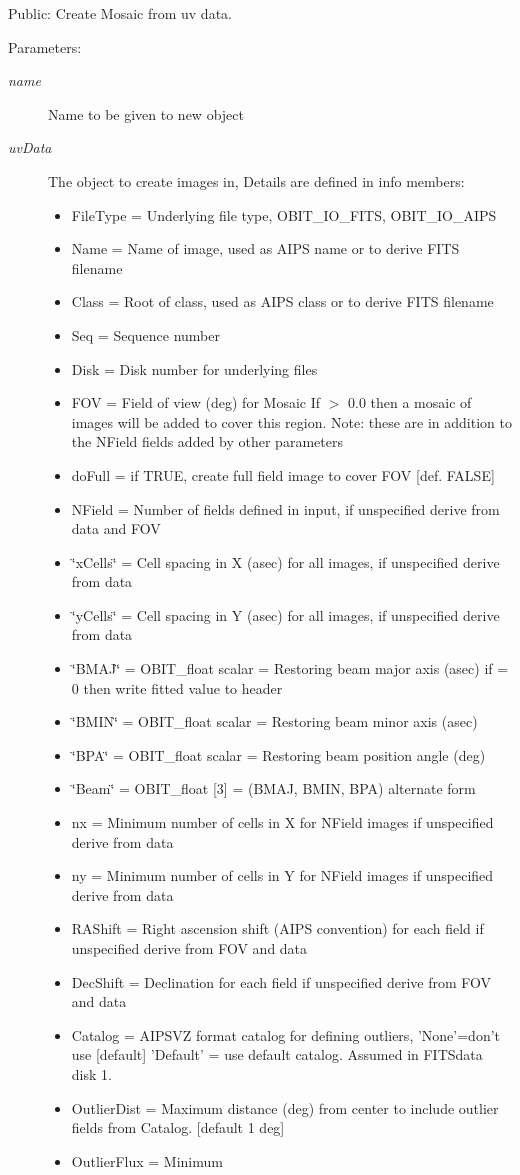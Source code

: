 Public: Create Mosaic from uv data. 

\begin{Desc}
\item[Parameters:]
\begin{description}
\item[{\em name}]Name to be given to new object \item[{\em uv\-Data}]The object to create images in, Details are defined in info members: \begin{itemize}
\item File\-Type = Underlying file type, OBIT\_\-IO\_\-FITS, OBIT\_\-IO\_\-AIPS \item Name = Name of image, used as AIPS name or to derive FITS filename \item Class = Root of class, used as AIPS class or to derive FITS filename \item Seq = Sequence number \item Disk = Disk number for underlying files \item FOV = Field of view (deg) for Mosaic If $>$ 0.0 then a mosaic of images will be added to cover this region. Note: these are in addition to the NField fields added by other parameters \item do\-Full = if TRUE, create full field image to cover FOV [def. FALSE] \item NField = Number of fields defined in input, if unspecified derive from data and FOV \item \char`\"{}x\-Cells\char`\"{} = Cell spacing in X (asec) for all images, if unspecified derive from data \item \char`\"{}y\-Cells\char`\"{} = Cell spacing in Y (asec) for all images, if unspecified derive from data \item \char`\"{}BMAJ\char`\"{} = OBIT\_\-float scalar = Restoring beam major axis (asec) if = 0 then write fitted value to header \item \char`\"{}BMIN\char`\"{} = OBIT\_\-float scalar = Restoring beam minor axis (asec) \item \char`\"{}BPA\char`\"{} = OBIT\_\-float scalar = Restoring beam position angle (deg) \item \char`\"{}Beam\char`\"{} = OBIT\_\-float [3] = (BMAJ, BMIN, BPA) alternate form \item nx = Minimum number of cells in X for NField images if unspecified derive from data \item ny = Minimum number of cells in Y for NField images if unspecified derive from data \item RAShift = Right ascension shift (AIPS convention) for each field if unspecified derive from FOV and data \item Dec\-Shift = Declination for each field if unspecified derive from FOV and data \item Catalog = AIPSVZ format catalog for defining outliers, 'None'=don't use [default] 'Default' = use default catalog. Assumed in FITSdata disk 1. \item Outlier\-Dist = Maximum distance (deg) from center to include outlier fields from Catalog. [default 1 deg] \item Outlier\-Flux = Minimum 
\end{itemize}
\end{description}
\end{Desc}
